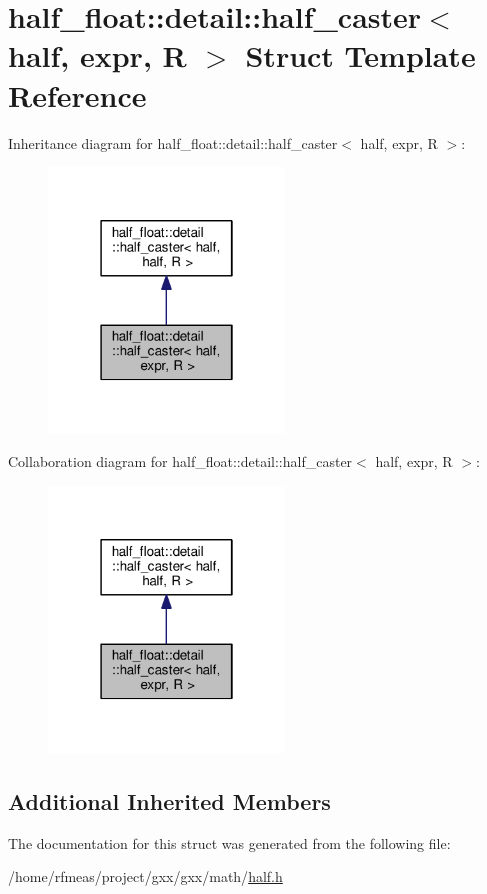 \hypertarget{structhalf__float_1_1detail_1_1half__caster_3_01half_00_01expr_00_01R_01_4}{}\section{half\+\_\+float\+:\+:detail\+:\+:half\+\_\+caster$<$ half, expr, R $>$ Struct Template Reference}
\label{structhalf__float_1_1detail_1_1half__caster_3_01half_00_01expr_00_01R_01_4}


Inheritance diagram for half\+\_\+float\+:\+:detail\+:\+:half\+\_\+caster$<$ half, expr, R $>$\+:
\nopagebreak
\begin{figure}[H]
\begin{center}
\leavevmode
\includegraphics[width=178pt]{structhalf__float_1_1detail_1_1half__caster_3_01half_00_01expr_00_01R_01_4__inherit__graph}
\end{center}
\end{figure}


Collaboration diagram for half\+\_\+float\+:\+:detail\+:\+:half\+\_\+caster$<$ half, expr, R $>$\+:
\nopagebreak
\begin{figure}[H]
\begin{center}
\leavevmode
\includegraphics[width=178pt]{structhalf__float_1_1detail_1_1half__caster_3_01half_00_01expr_00_01R_01_4__coll__graph}
\end{center}
\end{figure}
\subsection*{Additional Inherited Members}


The documentation for this struct was generated from the following file\+:\begin{DoxyCompactItemize}
\item 
/home/rfmeas/project/gxx/gxx/math/\hyperlink{half_8h}{half.\+h}\end{DoxyCompactItemize}
